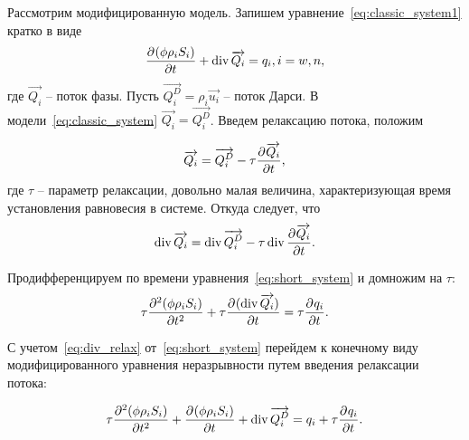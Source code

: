 Рассмотрим модифицированную модель. Запишем уравнение~\eqref{eq:classic_system1} кратко в виде
\begin{equation} \label{eq:short_system}
   \pd{(\phi \rho_i S_i)}{t} + \diver{ \overrightarrow{Q_i}} = q_i, i = w,n,
\end{equation}
где $\overrightarrow{Q_i}$ -- поток фазы.
Пусть $\overrightarrow{Q_i^D} = \rho_i \overrightarrow{u_i}$ -- поток Дарси.
В модели~\eqref{eq:classic_system} $\overrightarrow{Q_i} = \overrightarrow{Q_i^D}$.
Введем релаксацию потока, положим 

\begin{equation}
 \overrightarrow{Q_i} = \overrightarrow{Q_i^D} - \tau \pd{\overrightarrow{Q_i}}{t},
\end{equation}
где $\tau$ -- параметр релаксации, довольно малая величина, характеризующая время установления равновесия в системе. Откуда следует, что
\begin{equation} \label{eq:div_relax}
 \diver{\overrightarrow{Q_i}} = \diver{\overrightarrow{Q_i^D}} - \tau \diver{\pd{\overrightarrow{Q_i}}{t}}.
\end{equation}

Продифференцируем по времени уравнения~\eqref{eq:short_system} и домножим на $\tau$:
\begin{equation}
  \tau \pd[2]{(\phi \rho_i S_i)}{t} + \tau \pd{(\diver{ \overrightarrow{Q_i}})}{t} = \tau \pd{q_i}{t}.
\end{equation}

С учетом~\eqref{eq:div_relax} от~\eqref{eq:short_system} перейдем к конечному виду модифицированного уравнения неразрывности
путем введения релаксации потока:

\begin{equation} \label{eq:mod_system}
  \tau \pd[2]{(\phi \rho_i S_i)}{t} + \pd{(\phi \rho_i S_i)}{t} + \diver{ \overrightarrow{Q_i^D}} = q_i + \tau \pd{q_i}{t}.
\end{equation}

